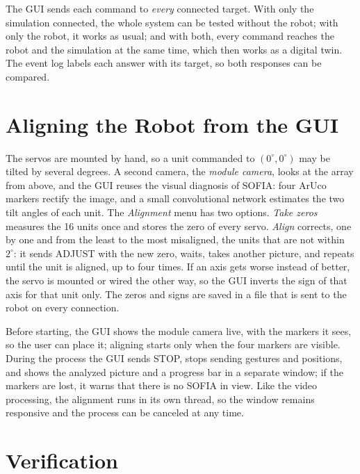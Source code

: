 \documentclass[lettersize,journal]{IEEEtran}
\begin{document}
	The GUI sends each command to \emph{every} connected target. With only the simulation connected, the whole system can be tested without the robot; with only the robot, it works as usual; and with both, every command reaches the robot and the simulation at the same time, which then works as a digital twin. The event log labels each answer with its target, so both responses can be compared.


	\section{Aligning the Robot from the GUI}
	\label{sec:align}

	The servos are mounted by hand, so a unit commanded to $(0^\circ,0^\circ)$ may be tilted by several degrees. A second camera, the \emph{module camera}, looks at the array from above, and the GUI reuses the visual diagnosis of SOFIA: four ArUco markers rectify the image, and a small convolutional network estimates the two tilt angles of each unit. The \emph{Alignment} menu has two options. \emph{Take zeros} measures the 16 units once and stores the zero of every servo. \emph{Align} corrects, one by one and from the least to the most misaligned, the units that are not within $2^\circ$: it sends ADJUST with the new zero, waits, takes another picture, and repeats until the unit is aligned, up to four times. If an axis gets worse instead of better, the servo is mounted or wired the other way, so the GUI inverts the sign of that axis for that unit only. The zeros and signs are saved in a file that is sent to the robot on every connection.

	Before starting, the GUI shows the module camera live, with the markers it sees, so the user can place it; aligning starts only when the four markers are visible. During the process the GUI sends STOP, stops sending gestures and positions, and shows the analyzed picture and a progress bar in a separate window; if the markers are lost, it warns that there is no SOFIA in view. Like the video processing, the alignment runs in its own thread, so the window remains responsive and the process can be canceled at any time.

	\section{Verification}
\end{document}
